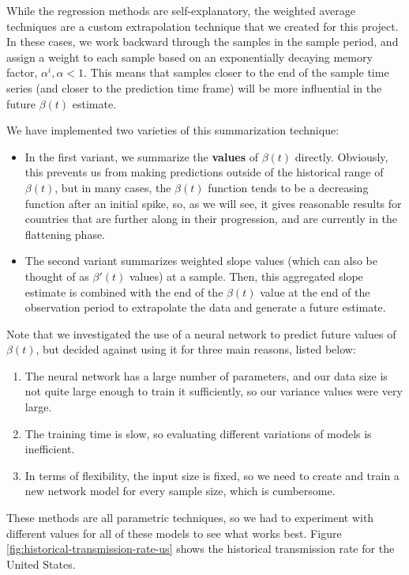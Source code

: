 \documentclass[11pt]{article}
\begin{document}
While the regression methods are self-explanatory, the weighted average techniques are a custom extrapolation technique that we created for this project. In these cases, we work backward through the samples in the sample period, and assign a weight to each sample based on an exponentially decaying memory factor, $\alpha^i, \alpha < 1$. This means that samples closer to the end of the sample time series (and closer to the prediction time frame) will be more influential in the future $\beta(t)$ estimate.

We have implemented two varieties of this summarization technique:
\begin{itemize}
    \item In the first variant, we summarize the \textbf{values} of $\beta(t)$ directly. Obviously, this prevents us from making predictions outside of the historical range of $\beta(t)$, but in many cases, the $\beta(t)$ function tends to be a decreasing function after an initial spike, so, as we will see, it gives reasonable results for countries that are further along in their progression, and are currently in the flattening phase.
    \item The second variant summarizes weighted slope values (which can also be thought of as $\beta'(t)$ values) at a sample. Then, this aggregated slope estimate is combined with the end of the $\beta(t)$ value at the end of the observation period to extrapolate the data and generate a future estimate.
\end{itemize}

Note that we investigated the use of a neural network to predict future values of $\beta(t)$, but decided against using it for three main reasons, listed below:
\begin{enumerate}
    \item The neural network has a large number of parameters, and our data size is not quite large enough to train it sufficiently, so our variance values were very large.
    \item The training time is slow, so evaluating different variations of models is inefficient.
    \item In terms of flexibility, the input size is fixed, so we need to create and train a new network model for every sample size, which is cumbersome.
\end{enumerate}

These methods are all parametric techniques, so we had to experiment with different values for all of these models to see what works best. Figure \ref{fig:historical-transmission-rate-us} shows the historical transmission rate for the United States.
\end{document}
